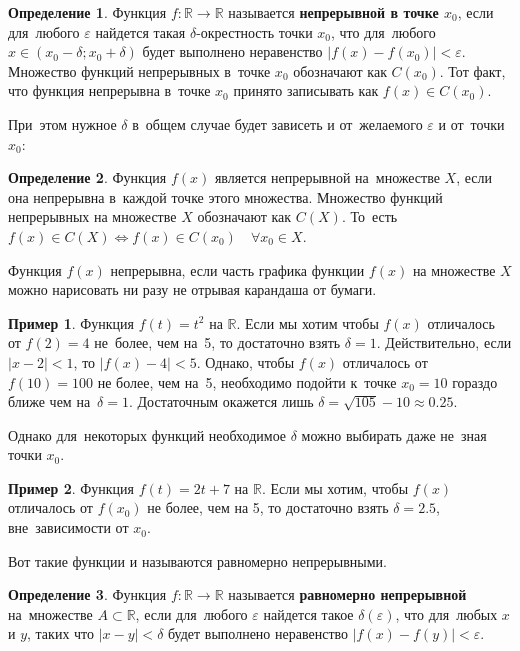 \documentclass[pdftex, 12pt, a4paper]{article}
\def\R{\ensuremath{\mathbb{R}}} %
\def \dt{\delta}
\newcommand{\e}{\varepsilon}
\renewcommand{\to}{\rightarrow}
\theoremstyle{definition} %
\newtheorem*{mydef}{Определение}
\newtheorem{myex}{Пример}
\numberwithin{problem}{section}
\newcommand{\indef}[1]{\textbf{#1}}
\numberwithin{blits}{section}
\begin{document}
\begin{mydef}
Функция $f:\R\to\R$ называется \indef{непрерывной в точке $x_{0}$},   если для~любого $\e$
 найдется такая $\dt$-окрестность точки $x_{0}$, что для~любого $x\in (x_{0}-\dt;x_{0}+\dt)$ будет выполнено неравенство $|f(x)-f(x_{0})|<\e$. Множество функций непрерывных в~точке $x_0$ обозначают как $C(x_0)$. Тот факт, что функция непрерывна в~точке $x_0$ принято записывать как $f(x) \in C(x_0)$.
\end{mydef}

При~этом нужное $\dt$ в~общем случае будет зависеть и от~желаемого $\e$ и от~точки $x_{0}$:

\begin{mydef}
Функция $f(x)$ является непрерывной на~множестве   $X$, если она непрерывна в~каждой точке этого множества. Множество функций непрерывных на множестве $X$ обозначают как $C(X)$.  То~есть $f(x) \in C(X) \Leftrightarrow f(x) \in C(x_0) \quad \forall x_0 \in X.$
\end{mydef}

Функция $f(x)$ непрерывна, если часть графика функции $f(x)$ на множестве $X$ можно нарисовать ни разу не отрывая карандаша от бумаги.


\begin{myex}
Функция $f(t)=t^{2}$ на $\R$. Если мы хотим чтобы $f(x)$ отличалось от $f(2)=4$ не~более, чем на~5, то достаточно взять $\delta=1$. Действительно, если $|x-2|<1$, то $|f(x)-4|<5$. Однако, чтобы $f(x)$ отличалось от~$f(10)=100$ не более, чем на~5, необходимо подойти к~точке $x_{0}=10$ гораздо ближе чем на~$\dt=1$. Достаточным окажется лишь $\dt=\sqrt{105}-10\approx 0.25$.
\end{myex}

Однако для~некоторых функций необходимое $\dt$ можно выбирать даже не~зная точки $x_{0}$.

\begin{myex}
Функция $f(t)=2t+7$ на $\R$. Если мы хотим, чтобы $f(x)$ отличалось от $f(x_{0})$ не более, чем на 5, то достаточно взять $\dt=2.5$, вне~зависимости от $x_{0}$.
\end{myex}


Вот такие функции и называются равномерно непрерывными.
\begin{mydef}
Функция $f:\R\to\R$ называется \indef{равномерно непрерывной}   на~множестве $A\subset \R$, если для~любого $\e$ найдется такое $\dt(\e)$, что для~любых $x$ и $y$, таких что $|x-y|<\dt$ будет выполнено неравенство $|f(x)-f(y)|<\e$.
\end{mydef}
\end{document}
